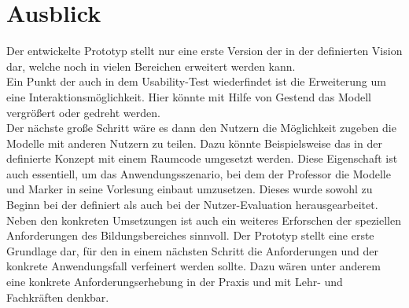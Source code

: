 \section{Ausblick}\label{sec:ausblick}
Der entwickelte Prototyp stellt nur eine erste Version der in der  definierten Vision dar, welche noch in vielen Bereichen erweitert werden kann. \\
Ein Punkt der auch in dem Usability-Test wiederfindet ist die Erweiterung um eine Interaktionsmöglichkeit. Hier könnte mit Hilfe von Gestend das Modell vergrößert oder gedreht werden. \\
Der nächste große Schritt wäre es dann den Nutzern die Möglichkeit zugeben die Modelle mit anderen Nutzern zu teilen. Dazu könnte Beispielsweise das in der  definierte Konzept mit einem Raumcode umgesetzt werden. Diese Eigenschaft ist auch essentiell, um das Anwendungsszenario, bei dem der Professor die Modelle und Marker in seine Vorlesung einbaut umzusetzen. Dieses wurde sowohl zu Beginn bei der  definiert als auch bei der Nutzer-Evaluation herausgearbeitet. \\
Neben den konkreten Umsetzungen ist auch ein weiteres Erforschen der speziellen Anforderungen des Bildungsbereiches sinnvoll. Der Prototyp stellt eine erste Grundlage dar, für den in einem nächsten Schritt die Anforderungen und der konkrete Anwendungsfall verfeinert werden sollte. Dazu wären unter anderem eine konkrete Anforderungserhebung in der Praxis und mit Lehr- und Fachkräften denkbar. 
